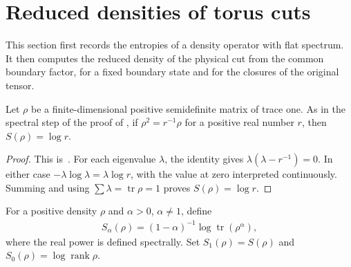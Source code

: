 \section{Reduced densities of torus cuts}%
\label{sec:peps_torus_cut_densities}

This section first records the entropies of a density operator with flat
spectrum. It then computes the reduced density of the physical cut from the
common boundary factor, for a fixed boundary state and for the closures of the
original tensor.

\begin{lemma}%
    \label{thm:peps_flat_density_entropy}
    \leanok
    Let $\rho$ be a finite-dimensional positive semidefinite matrix of
    trace one. As in the spectral step of the proof of
    \cite[Theorem~6.9]{Schuch2010PEPS}, if $\rho^2=r^{-1}\rho$ for a positive real number $r$, then
    $S(\rho)=\log r$.
\end{lemma}
\begin{proof}\leanok
    This is~\cite[``Entropy of a flat density operator'']{QICLean2026Blueprint}.
    For each eigenvalue $\lambda$, the identity gives
    $\lambda(\lambda-r^{-1})=0$. In either case
    $-\lambda\log\lambda=\lambda\log r$, with the value at zero
    interpreted continuously. Summing and using
    $\sum\lambda=\operatorname{tr}\rho=1$ proves $S(\rho)=\log r$.
\end{proof}

\begin{definition}%
    \label{def:peps_renyi_entropy}
    \leanok
    For a positive density $\rho$ and $\alpha>0$, $\alpha\ne1$, define
    \begin{align}
        S_\alpha(\rho)=(1-\alpha)^{-1}
        \log\operatorname{tr}(\rho^\alpha),
    \end{align}
    where the real power is defined spectrally. Set $S_1(\rho)=S(\rho)$
    and $S_0(\rho)=\log\operatorname{rank}\rho$.
\end{definition}

